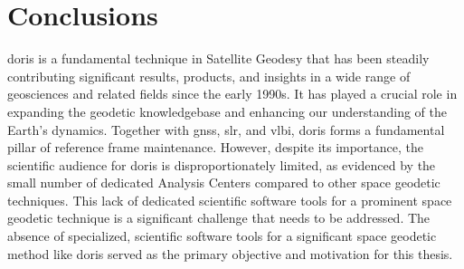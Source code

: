 \section{Conclusions}\label{sec:conclusions}

\iffalse
\gls{doris} is one of the fundamental techniques of Satellite Geodesy, steadily contributing 
since the early 1990s significant results, products and insight in a wide range of geosciences 
and related fields. It has played a crucial role in expanding the geodetic knowledgebase 
and our understanding of the Earth's dynamics. Along with \gls{gnss}, \gls{slr} and 
\gls{vlbi}, it constitutes a fundamental pillar of reference frame maintenance. Yet, 
its scientific audience is dsiproportionally limited, a fact evident by the small number 
of dedicated Analysis Centers compared to the other space geodetic techniques. This 
lack of dedicated, scientific software tools for a prominent space geodetic technique 
such as \gls{doris} was the target and driving force for this Thesis.
\fi
\gls{doris} is a fundamental technique in Satellite Geodesy that has been steadily 
contributing significant results, products, and insights in a wide range of 
geosciences and related fields since the early 1990s. It has played a crucial 
role in expanding the geodetic knowledgebase and enhancing our understanding 
of the Earth's dynamics. Together with \gls{gnss}, \gls{slr}, and \gls{vlbi}, \gls{doris} 
forms a fundamental pillar of reference frame maintenance. However, despite its 
importance, the scientific audience for \gls{doris} is disproportionately 
limited, as evidenced by the small number of dedicated Analysis Centers compared 
to other space geodetic techniques. This lack of dedicated scientific software 
tools for a prominent space geodetic technique is a significant challenge that 
needs to be addressed. The absence of specialized, scientific software tools for 
a significant space geodetic method like \gls{doris} served as the primary 
objective and motivation for this thesis.

